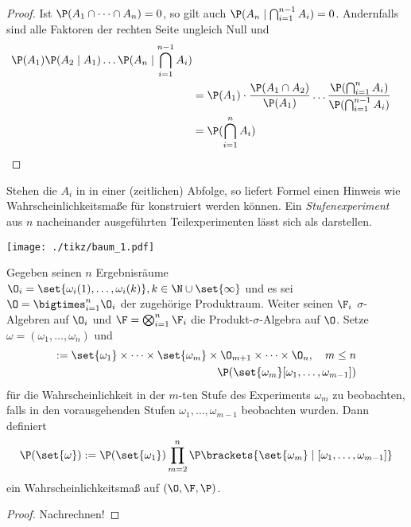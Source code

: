 \begin{proof}
	Ist $\P(A_1 \cap \dots \cap A_n) = 0$, so gilt auch $\P(A_n \mid \bigcap_{i=1}^{n-1} A_i) = 0$. Andernfalls sind alle Faktoren der rechten Seite ungleich Null und
	\begin{align*}
		\P(A_1) \P(A_2 \mid A_1) \dots \P(A_n \mid \bigcap_{i=1}^{n-1} A_i) \\
		&= \P(A_1) \cdot \frac{\P(A_1 \cap A_2)}{\P(A_1)} \dots \frac{\P(\bigcap_{i=1}^{n} A_i)}{\P(\bigcap_{i=1}^{n-1}A_i)} \\
		&= \P(\bigcap_{i=1}^n A_i)	
	\end{align*}
\end{proof} %

Stehen die $A_i$ in  in einer (zeitlichen) Abfolge, so liefert Formel einen Hinweis wie Wahrscheinlichkeitsmaße für  konstruiert werden können. Ein \emph{Stufenexperiment} aus $n$ nacheinander ausgeführten Teilexperimenten lässt sich als  darstellen.

\begin{center}
		\texttt{[image: ./tikz/baum\_1.pdf]}
\end{center}

\begin{proposition}
	Gegeben seinen $n$ Ergebnisräume $\O_i = \set{\omega_i (1), \dots, \omega_i (k)}, k \in \N \cup \set{\infty}$ und es sei $\O = \bigtimes_{i = 1}^n \O_i$ der zugehörige Produktraum. Weiter seinen $\F_i$ $\sigma$-Algebren auf $\O_i$ und $\F = \bigotimes_{i=1}^n \F_i$ die Produkt-$\sigma$-Algebra auf $\O$. Setze $\omega = (\omega_1,\dots,\omega_n)$ und
	\begin{align*}
		[\omega_1,\dots,\omega_m]:= \set{\omega_1}\times \dots \times \set{\omega_m} \times \O_{m+1} \times \cdots \times \O_{n},\quad m\le n\\
		\P(\set{\omega_m}[\omega_1,\dots,\omega_{m-1}])
	\end{align*}
	für die Wahrscheinlichkeit in der $m$-ten Stufe des Experiments $\omega_m$ zu beobachten, falls in den vorausgehenden Stufen $\omega_1,\dots,\omega_{m-1}$ beobachten wurden. Dann definiert
	\begin{align*}
		\P(\set{\omega}) := \P(\set{\omega_1}) \prod_{m=2}^{n}\P\brackets{\set{\omega_m} \mid [\omega_1, \dots, \omega_{m-1}]}
	\end{align*}
	ein Wahrscheinlichkeitsmaß auf $(\O, \F, \P)$.
\end{proposition}
\begin{proof}
	Nachrechnen!
\end{proof}

